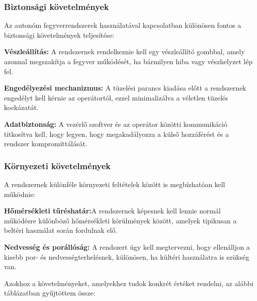 \subsubsection*{Biztonsági követelmények}

Az autonóm fegyverrendszerek használatával kapcsolatban különösen fontos a biztonsági követelmények teljesítése:

\begin{list}{}{}
	\item \textbf{Vészleállítás:} A rendszernek rendelkeznie kell egy vészleállító gombbal, amely azonnal megszakítja a fegyver működését, ha bármilyen hiba vagy vészhelyzet lép fel.
	\item \textbf{Engedélyezési mechanizmus:} A tüzelési parancs kiadása előtt a rendszernek engedélyt kell kérnie az operátortól, ezzel minimalizálva a véletlen tüzelés kockázatát.
	\item \textbf{Adatbiztonság:} A vezérlő szoftver és az operátor közötti kommunikáció titkosítva kell, hogy legyen, hogy megakadályozza a külső hozzáférést és a rendszer kompromittálását.
\end{list}

\pagebreak

\subsubsection*{Környezeti követelmények}

A rendszernek különféle környezeti feltételek között is megbízhatóan kell működnie:

\begin{list}{}{}
	\item \textbf{Hőmérsékleti tűréshatár:}A rendszernek képesnek kell lennie normál működésre különböző hőmérsékleti körülmények között, amelyek tipikusan a beltéri használat során fordulnak elő.
	\item \textbf{Nedvesség és porállóság:} A rendszert úgy kell megtervezni, hogy ellenálljon a kisebb por- és nedvességterhelésnek, különösen, ha kültéri használatra is szükség van.
\end{list}

Azokhoz a követelményeket, amelyekhez tudok konkrét értéket rendelni, az alábbi táblázatban gyűjtöttem össze:

